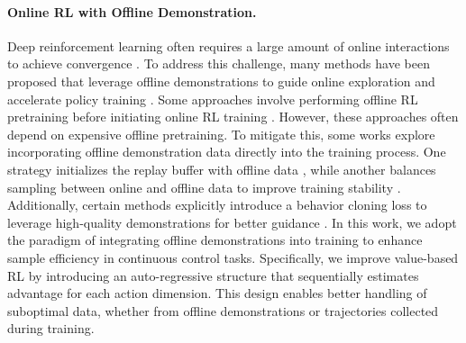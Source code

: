 \paragraph{Online RL with Offline Demonstration.}
Deep reinforcement learning often requires a large amount of online interactions to achieve convergence \cite{DotaFive, NatureDQN}. 
To address this challenge, many methods have been proposed that leverage offline demonstrations to guide online exploration and accelerate policy training \cite{DAPG, RLPD}. 
Some approaches involve performing offline RL pretraining before initiating online RL training \cite{Off2On, CalQL, UniO4, BOORL}. 
However, these approaches often depend on expensive offline pretraining. 
To mitigate this, some works explore incorporating offline demonstration data directly into the training process. 
One strategy initializes the replay buffer with offline data \cite{DQfD, RLPD}, while another balances sampling between online and offline data to improve training stability \cite{PEX, Modem}. 
Additionally, certain methods explicitly introduce a behavior cloning loss to leverage high-quality demonstrations for better guidance \cite{NPPAC, DAPG, HERDDPG}.  
In this work, we adopt the paradigm of integrating offline demonstrations into training to enhance sample efficiency in continuous control tasks. 
Specifically, we improve value-based RL by introducing an auto-regressive structure that sequentially estimates advantage for each action dimension. 
This design enables better handling of suboptimal data, whether from offline demonstrations or trajectories collected during training.
